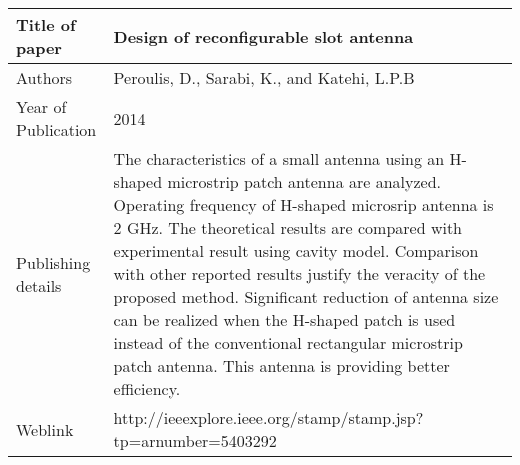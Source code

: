 \documentclass{article}
\begin{document}
\begin{table}
  \centering
	\begin{tabular}{ |l|p{11cm}| }
			\hline
		     Title of paper &  Design of reconfigurable slot antenna  \\
		     \hline
			 Authors & Peroulis, D., Sarabi, K., and Katehi, L.P.B \\
			\hline
			 Year of Publication & 2014 \\
			\hline
			 Publishing details & The characteristics of a small antenna using an H-shaped microstrip patch antenna are analyzed. Operating frequency of H-shaped microsrip antenna is 2 GHz. The theoretical results are compared with experimental result using cavity model. Comparison with other reported results justify the veracity of the proposed method. Significant reduction of antenna size can be realized when the H-shaped patch is used instead of the conventional rectangular microstrip patch antenna. This antenna is providing better efficiency.\\
			\hline
			 Weblink & http://ieeexplore.ieee.org/stamp/stamp.jsp?tp=arnumber=5403292 \\
			 \hline			 
	\end{tabular}		

\end{table}
\end{document}
